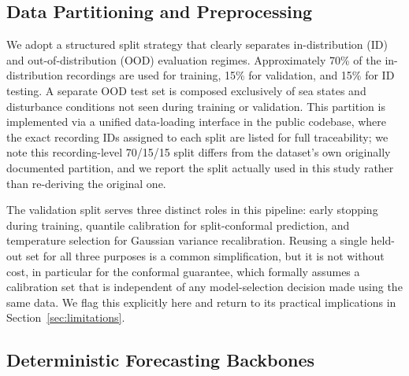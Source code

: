 \documentclass[a4paper,fleqn]{cas-sc}
\begin{document}
\subsection{Data Partitioning and Preprocessing}
\label{sec:splits}

We adopt a structured split strategy that clearly separates in-distribution (ID) and out-of-distribution (OOD) evaluation regimes. Approximately 70\% of the in-distribution recordings are used for training, 15\% for validation, and 15\% for ID testing. A separate OOD test set is composed exclusively of sea states and disturbance conditions not seen during training or validation. This partition is implemented via a unified data-loading interface in the public codebase, where the exact recording IDs assigned to each split are listed for full traceability; we note this recording-level 70/15/15 split differs from the dataset's own originally documented partition, and we report the split actually used in this study rather than re-deriving the original one.

The validation split serves three distinct roles in this pipeline: early stopping during training, quantile calibration for split-conformal prediction, and temperature selection for Gaussian variance recalibration. Reusing a single held-out set for all three purposes is a common simplification, but it is not without cost, in particular for the conformal guarantee, which formally assumes a calibration set that is independent of any model-selection decision made using the same data. We flag this explicitly here and return to its practical implications in Section~\ref{sec:limitations}.

\subsection{Deterministic Forecasting Backbones}
\label{sec:backbones}
\end{document}
